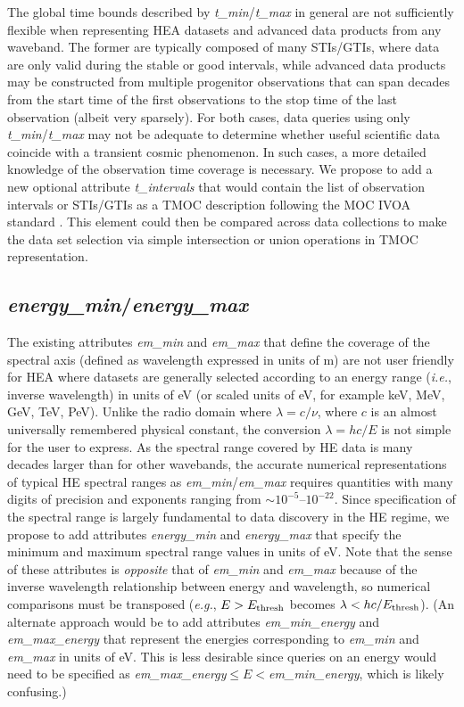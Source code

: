 \documentclass[11pt,a4paper]{ivoa}
\begin{document}
The global time bounds described by {\em t\_min\/}/{\em t\_max} in general are not sufficiently flexible when representing HEA datasets and advanced data products from any waveband.  The former are typically composed of many \gls{STIs}/\gls{GTIs}, where data are only valid during the stable or good intervals, while advanced data products may be constructed from multiple progenitor observations that can span decades from the start time of the first observations to the stop time of the last observation (albeit very sparsely).  For both cases, data queries using only {\em t\_min\/}/{\em t\_max} may not be adequate to determine whether useful scientific data coincide with a transient cosmic phenomenon.  In such cases, a more detailed knowledge of the observation time coverage is necessary.  We propose to add a new optional attribute {\em t\_intervals} that would contain the list of observation intervals or STIs/GTIs as a TMOC description following the \gls{MOC} IVOA standard  \citep{2022ivoa.spec.0727F}. This element could then be compared across data collections to make the data set selection via simple intersection or union operations in TMOC representation.

\subsection{{\em energy\_min\/}/{\em energy\_max\/}}

The existing attributes {\em em\_min\/} and {\em em\_max\/} that define the coverage of the spectral axis (defined as wavelength expressed in units of m) are not user friendly for HEA where datasets are generally selected according to an energy range ({\em i.e.\/}, inverse wavelength) in units of eV (or scaled units of eV, for example keV, MeV, GeV, TeV, PeV).  Unlike the radio domain where $\lambda = c/\nu$, where $c$ is an almost universally remembered physical constant, the conversion $\lambda = hc/E$ is not simple for the user to express.  As the spectral range covered by HE data is many decades larger than for other wavebands, the accurate numerical representations of typical HE spectral ranges as {\em em\_min\/}/{\em em\_max\/} requires quantities with many digits of precision and exponents ranging from $\sim\!10^{-5}$--$10^{-22}$.  Since specification of the spectral range is largely fundamental to data discovery in the HE regime, we propose to add attributes {\em energy\_min\/} and {\em energy\_max\/} that specify the minimum and maximum spectral range values in units of eV\null.  Note that the sense of these attributes is {\em opposite\/} that of {\em em\_min\/} and {\em em\_max\/} because of the inverse wavelength relationship between energy and wavelength, so numerical comparisons must be transposed ({\em e.g.\/}, $E>E_{\rm thresh}$ becomes $\lambda<hc/E_{\rm thresh}$).  (An alternate approach would be to add attributes {\em em\_min\_energy\/} and {\em em\_max\_energy\/} that represent the energies corresponding to {\em em\_min\/} and {\em em\_max\/} in units of eV\null.  This is less desirable since queries on an energy would need to be specified as {\em em\_max\_energy\/}${}\leq E <{}${\em em\_min\_energy\/}, which is likely confusing.)
\end{document}
